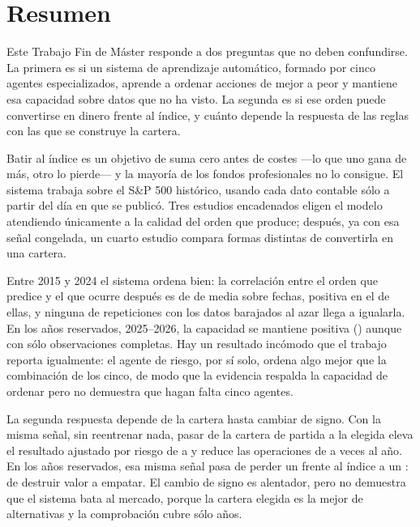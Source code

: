 \chapter*{Resumen}

Este Trabajo Fin de Máster responde a dos preguntas que no deben confundirse. La primera es si un
sistema de aprendizaje automático, formado por cinco agentes especializados, aprende a ordenar
acciones de mejor a peor y mantiene esa capacidad sobre datos que no ha visto. La segunda es si ese
orden puede convertirse en dinero frente al índice, y cuánto depende la respuesta de las reglas con
las que se construye la cartera.

Batir al índice es un objetivo de suma cero antes de costes ---lo que uno gana de más, otro lo
pierde--- y la mayoría de los fondos profesionales no lo consigue. El sistema trabaja sobre el S\&P
500 histórico, usando cada dato contable sólo a partir del día en que se publicó. Tres estudios
encadenados eligen el modelo atendiendo únicamente a la calidad del orden que produce; después, ya
con esa señal congelada, un cuarto estudio compara \NumCarteras{} formas distintas de convertirla en
una cartera.

Entre 2015 y 2024 el sistema ordena bien: la correlación entre el orden que predice y el que ocurre
después es de \RankICSeleccion{} de media sobre \CohortesSeleccion{} fechas, positiva en el
\FraccionICPositiva{} de ellas, y ninguna de \NumPermutaciones{} repeticiones con los datos barajados
al azar llega a igualarla. En los años reservados, 2025--2026, la capacidad se mantiene positiva
(\RankICReservado{}) aunque con sólo \CohortesReservadas{} observaciones completas. Hay un resultado
incómodo que el trabajo reporta igualmente: el agente de riesgo, por sí solo, ordena algo mejor que
la combinación de los cinco, de modo que la evidencia respalda la capacidad de ordenar pero no
demuestra que hagan falta cinco agentes.

La segunda respuesta depende de la cartera hasta cambiar de signo. Con la misma señal, sin
reentrenar nada, pasar de la cartera de partida a la elegida eleva el resultado ajustado por riesgo
de \IRModelo{} a \IRCartera{} y reduce las operaciones de \TurnoverModelo{} a \TurnoverCartera{}
veces al año. En los años reservados, esa misma señal pasa de perder un \ExcesoModeloReservado{}
frente al índice a un \ExcesoCarteraReservado{}: de destruir valor a empatar. El cambio de signo es
alentador, pero no demuestra que el sistema bata al mercado, porque la cartera elegida es la mejor
de \NumCarteras{} alternativas y la comprobación cubre sólo \AnosCarteraReservada{} años.

